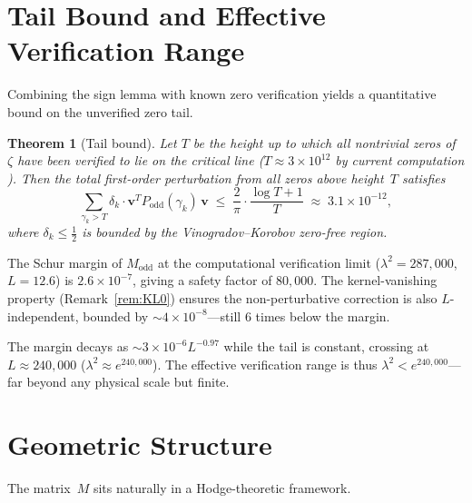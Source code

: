 \documentclass[11pt,a4paper]{article}
\newtheorem{theorem}{Theorem}[section]
\begin{document}
\section{Tail Bound and Effective Verification Range}\label{sec:tail}

Combining the sign lemma with known zero verification yields a quantitative bound on the unverified zero tail.

\begin{theorem}[Tail bound]\label{thm:tail}
Let $T$ be the height up to which all nontrivial zeros of~$\zeta$ have been verified to lie on the critical line ($T \approx 3 \times 10^{12}$ by current computation \cite{Platt2021}). Then the total first-order perturbation from all zeros above height~$T$ satisfies
\begin{equation}\label{eq:tail}
\sum_{\gamma_k > T} \delta_k \cdot \mathbf{v}^T P_{\mathrm{odd}}(\gamma_k)\, \mathbf{v}
\;\leq\; \frac{2}{\pi} \cdot \frac{\log T + 1}{T}
\;\approx\; 3.1 \times 10^{-12},
\end{equation}
where $\delta_k \leq \tfrac{1}{2}$ is bounded by the Vinogradov--Korobov zero-free region.
\end{theorem}

The Schur margin of $M_{\mathrm{odd}}$ at the computational verification limit ($\lambda^2 = 287{,}000$, $L = 12.6$) is $2.6 \times 10^{-7}$, giving a safety factor of $80{,}000$. The kernel-vanishing property (Remark~\ref{rem:KL0}) ensures the non-perturbative correction is also $L$-independent, bounded by $\sim 4 \times 10^{-8}$---still $6$ times below the margin.

The margin decays as $\sim 3 \times 10^{-6} L^{-0.97}$ while the tail is constant, crossing at $L \approx 240{,}000$ ($\lambda^2 \approx e^{240{,}000}$). The effective verification range is thus $\lambda^2 < e^{240{,}000}$---far beyond any physical scale but finite.

\section{Geometric Structure}\label{sec:geometric}

The matrix~$M$ sits naturally in a Hodge-theoretic framework.
\end{document}
